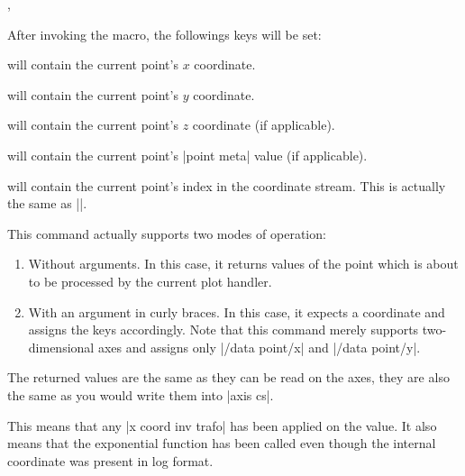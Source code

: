 \begin{commandlist}{\pgfplotspointgetcoordinates,\pgfplotspointgetcoordinates{}}

    After invoking the macro, the followings keys will be set:

     will contain the current point's $x$ coordinate.

     will contain the current point's $y$ coordinate.

     will contain the current point's $z$ coordinate
    (if applicable).

     will contain the current point's
    |point meta| value (if applicable).

     will contain the current point's index in
    the coordinate stream. This is actually the same as |\coordindex|.

    This command actually supports two modes of operation:
    \begin{enumerate}
        \item Without arguments. In this case, it returns values of the point
            which is about to be processed by the current plot handler.
        \item With an argument in curly braces. In this case, it expects a
            coordinate and assigns the keys accordingly. Note that this
            command merely supports two-dimensional axes and assigns only
            |/data point/x| and |/data point/y|.
    \end{enumerate}

    The returned values are the same as they can be read on the axes, they are
    also the same as you would write them into |axis cs|.

    This means that any |x coord inv trafo| has been applied on the value. It
    also means that the exponential function has been called even though the
    internal coordinate was present in log format.


\end{commandlist}
